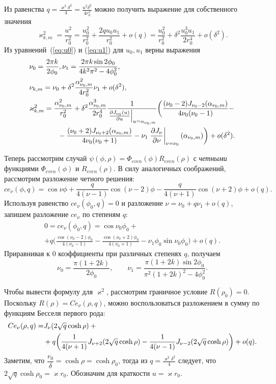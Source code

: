 Из равенства $q=\frac{\varkappa^2 \delta^2}{4}=\frac{u^2 \delta^2}{4 r_0^2}$ можно получить выражение для собственного значения
$$\varkappa_{k, m}^2 = \frac{u^2}{r_0^2} = \frac{u_0^2}{r_0^2} + \frac{2 q u_0 u_1}{r_0^2} + o(q)= \frac{u_0^2}{r_0^2} +  \delta^2 \frac{u_0^3 u_1}{2 r_0^4} + o(\delta^2).$$ 
Из уравнений~(\ref{eq:u0}) и (\ref{eq:u1}) для $u_0, u_1$ верны выражения
\begin{align}
  & \nu_0 = \frac{2\pi k}{2\phi_0}, \nu_1 = \frac{2 \pi k \sin 2 \phi_0}{4 k^2\pi^2  - 4\phi_0^2},\\
    & \nu_{k, m} = \nu_0 + \delta^2 \frac{\alpha_{\nu_0, m}^2}{4 r_0^2} \nu_1 + o(\delta^2), \\
   & \varkappa_{k, m}^2 = \frac{\alpha_{\nu_0, m}^2}{r_0^2} 
+  \delta^2 \frac{\alpha_{\nu_0, m}^3}{2 r_0^4}\frac{1}{ \left.\frac{\partial J_{\nu_0}(u)}{\partial u}\right|_{u=\alpha_{\nu_0, m}} } \biggl(
\frac{(\nu_0 - 2)J_{\nu_0-2}(\alpha_{\nu_0, m})   }{4\nu_0 (\nu_0-1)} - \notag \\
&\qquad\qquad{}- \frac{(\nu_0 + 2)J_{\nu_0+2}(\alpha_{\nu_0, m})}{4\nu_0 (\nu_0+1)} - \nu_1 \left.\frac{\partial J_\nu}{\partial \nu}\right|_{\nu = \nu_0}(\alpha_{\nu_0, m})
    \biggr) + o(\delta^2).
 \label{eq:oddSe_nueigenvalues}
 \end{align}


Теперь рассмотрим случай  $\psi(\phi, \rho) = \Phi_{even}(\phi) R_{even}(\rho)$ с \textit{четными} функциями $ \Phi_{even}(\phi) $ и $R_{even}(\rho)$. 
В силу аналогичных соображений, рассмотрим разложение четного решения:
\[
ce_\nu(\phi, q) = 	\cos{\nu\phi} + 
	\frac{q}{4(\nu-1)} \cos{(\nu-2)\phi} -\frac{q}{4(\nu+1)} \cos{(\nu+2)\phi} + o(q).
\]
Используя равенство $ce_\nu(\phi_0, q)=0$ и разложение $\nu = \nu_0 + q \nu_1 + o(q)$,
запишем разложение $ce_\nu$  по степеням $q$:
\begin{multline*}
0=ce_\nu(\phi_0, q) = 	\cos{\nu_0\phi_0}  + \\
+q \biggl(	\frac{\cos{(\nu_0-2)\phi_0}}{4(\nu_0-1)}  -\frac{\cos{(\nu_0+2)\phi_0}}{4(\nu_0+1)} - \nu_1 \phi_0 \sin \nu_0 \phi_0 \biggr) + o(q).
 \end{multline*}
Приравнивая к  $0$ коэффициенты при различных степенях  $q$, получаем
\begin{equation*}
    \nu_0 = \frac{\pi (1 + 2 k)}{2 \phi_0}, \qquad \nu_1 = \frac{\pi (1+2k) \sin 2\phi_0}{\pi^2(1+2k)^2 - 4\phi_0^2}.
\end{equation*}

Чтобы вывести формулу для  $\varkappa^2$, рассмотрим граничное условие $R(\rho_0) = 0$. 
Поскольку $R(\rho) = Ce_\nu(\rho, q)$, можно воспользоваться разложением в сумму по функциям Бесселя первого рода:
\begin{align*}
Ce_\nu(\rho, q) = & J_\nu(2\sqrt{q} \cosh{\rho}) + {}\notag \\
&{}+q \biggl( \frac{1}{4(\nu+1)} J_{\nu+2}(2\sqrt{q}\cosh{\rho}) -\frac{1}{4(\nu-1)} J_{\nu-2}(2\sqrt{q} \cosh{\rho})
\biggr) + o(q).
\end{align*}
Заметим, что $\dfrac{r_0}{\delta} = \cosh \rho = \cosh \rho_0 $, тогда из  $q = \frac{\varkappa^2 \delta^2}{4}$ следует, что $2\sqrt{q} \cosh{\rho_0} =   \varkappa r_0$. 
Обозначим для краткости $u = \varkappa r_0$. 

